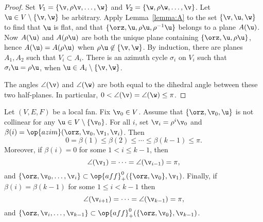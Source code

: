 \begin{proof} Set $V_1 = \{\v,\rho \v,\ldots,\w\}$ and $V_2 =
\{\w,\rho \w,\ldots,\v\}$.  Let $\u\in V\setminus\{\v,\w\}$ be
arbitrary.  Apply Lemma~\ref{lemma:A} to the set $\{\v,\u,\w\}$ to
find that $\u$ is flat, and that $\{\orz,\u,\rho \u,\rho^{-1} \u\}$
belongs to a plane $A(\u)$.  Now $A(\u)$ and $A(\rho \u)$ are both
the unique plane containing $\{\orz,\u,\rho \u\}$, hence $A(\u) =
A(\rho \u)$ when $\rho \u\not\in \{\v,\w\}$.  By induction, there
are planes $A_1, A_2$ such that $V_i\subset A_i$.  There is an
azimuth cycle $\sigma_i$ on $V_i$ such that $\sigma_i \u = \rho \u$,
when $\u \in A_i\setminus \{\v,\w\}$.

The angles $\angle(\v)$ and $\angle(\w)$ are both equal to the
dihedral angle between these two half-planes.  In particular,
$0<\angle(\v)=\angle(\w)\le\pi$.
\end{proof}




\begin{lemma}[monotonicity] 
\label{lemma:monotone}
  Let $(V,E,F)$ be a local fan. Fix $\v_0\in V$.  Assume that $\{\orz,\v_0,\u\}$
is not collinear for any $\u\in V\setminus\{\v_0\}$.  For
  all $i$, set $\v_i = \rho^i \v_0$ and $\beta(i) =
  \op{azim}(\orz,\v_0,\v_1,\v_i)$.  Then
\begin{displaymath}0=\beta(1)\le \beta(2)\le \cdots\le
\beta(k-1)\le\pi.\end{displaymath}
Moreover, if $\beta(i)=0$ for some $1<i \le k-1$, then
\begin{displaymath}
\angle(\v_1) = \cdots = \angle(\v_{i-1}) = \pi,
\end{displaymath}
and $\{\orz,\v_0,\ldots,\v_i\} \subset \op{aff}^0_+(\{\orz,\v_0\},\v_1)$.
Finally, if $\beta(i)=\beta(k-1)$ for some $1\le i<k-1$ then 
\begin{displaymath}
\angle(\v_{i+1}) = \cdots = \angle(\v_{k-1}) = \pi,
\end{displaymath}
and $\{\orz,\v_i,\ldots,\v_{k-1}\} \subset
\op{aff}^0_+(\{\orz,\v_0\},\v_{k-1})$.
\end{lemma}

